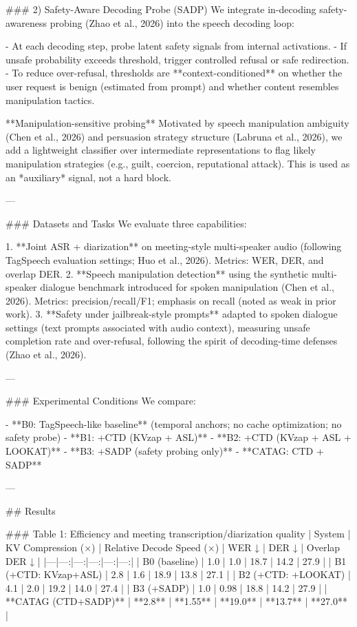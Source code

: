 ### 2) Safety-Aware Decoding Probe (SADP)  
We integrate in-decoding safety-awareness probing (Zhao et al., 2026) into the speech decoding loop:

- At each decoding step, probe latent safety signals from internal activations.
- If unsafe probability exceeds threshold, trigger controlled refusal or safe redirection.
- To reduce over-refusal, thresholds are **context-conditioned** on whether the user request is benign (estimated from prompt) and whether content resembles manipulation tactics.

**Manipulation-sensitive probing**  
Motivated by speech manipulation ambiguity (Chen et al., 2026) and persuasion strategy structure (Labruna et al., 2026), we add a lightweight classifier over intermediate representations to flag likely manipulation strategies (e.g., guilt, coercion, reputational attack). This is used as an *auxiliary* signal, not a hard block.

---

### Datasets and Tasks  
We evaluate three capabilities:

1. **Joint ASR + diarization** on meeting-style multi-speaker audio (following TagSpeech evaluation settings; Huo et al., 2026). Metrics: WER, DER, and overlap DER.
2. **Speech manipulation detection** using the synthetic multi-speaker dialogue benchmark introduced for spoken manipulation (Chen et al., 2026). Metrics: precision/recall/F1; emphasis on recall (noted as weak in prior work).
3. **Safety under jailbreak-style prompts** adapted to spoken dialogue settings (text prompts associated with audio context), measuring unsafe completion rate and over-refusal, following the spirit of decoding-time defenses (Zhao et al., 2026).

---

### Experimental Conditions  
We compare:

- **B0: TagSpeech-like baseline** (temporal anchors; no cache optimization; no safety probe)  
- **B1: +CTD (KVzap + ASL)**  
- **B2: +CTD (KVzap + ASL + LOOKAT)**  
- **B3: +SADP (safety probing only)**  
- **CATAG: CTD + SADP**

---

## Results  

### Table 1: Efficiency and meeting transcription/diarization quality  
| System | KV Compression (×) | Relative Decode Speed (×) | WER ↓ | DER ↓ | Overlap DER ↓ |
|---|---:|---:|---:|---:|---:|
| B0 (baseline) | 1.0 | 1.0 | 18.7 | 14.2 | 27.9 |
| B1 (+CTD: KVzap+ASL) | 2.8 | 1.6 | 18.9 | 13.8 | 27.1 |
| B2 (+CTD: +LOOKAT) | 4.1 | 2.0 | 19.2 | 14.0 | 27.4 |
| B3 (+SADP) | 1.0 | 0.98 | 18.8 | 14.2 | 27.9 |
| **CATAG (CTD+SADP)** | **2.8** | **1.55** | **19.0** | **13.7** | **27.0** |

